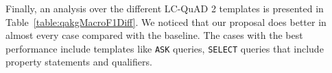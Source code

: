 \newpage

Finally, an analysis over the different LC-QuAD 2 templates is presented in Table~\ref{table:qakgMacroF1Diff}. 
We noticed that our proposal does better in almost every case compared with the baseline. The 
cases with the best performance include templates like \texttt{ASK} queries, \texttt{SELECT} 
queries that include property statements and qualifiers. 

\begin{table}[h!]
    \centering
\end{table}
